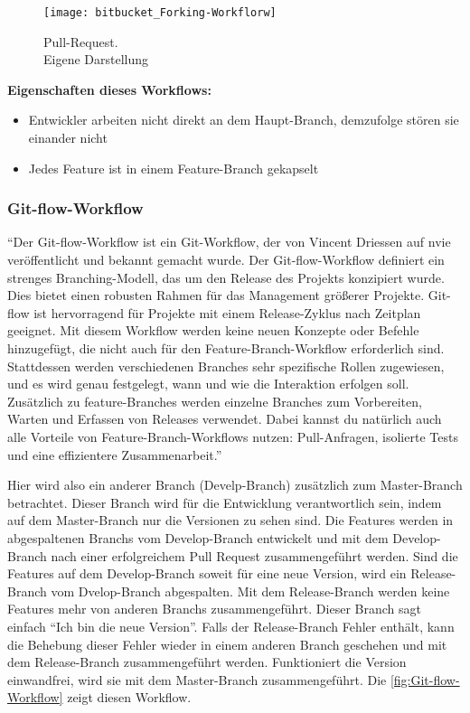 \begin{figure}[htbp]
	\centering
	\texttt{[image: bitbucket\_Forking-Workflorw]}
	\caption[Feature-Branch-Workflow]{Pull-Request.\\Eigene Darstellung}
	\label{fig:Forking-workflow}
\end{figure}

\textbf{Eigenschaften dieses Workflows:}
\begin{itemize}
	\item Entwickler arbeiten nicht direkt an dem Haupt-Branch, demzufolge stören sie einander nicht
	\item Jedes Feature ist in einem Feature-Branch gekapselt
\end{itemize}

\subsubsection{Git-flow-Workflow}
\label{subsubsec:Git-flow-Workflow}

"`Der Git-flow-Workflow ist ein Git-Workflow, der von Vincent Driessen auf nvie veröffentlicht und bekannt gemacht wurde. Der Git-flow-Workflow definiert ein strenges Branching-Modell, das um den Release des Projekts konzipiert wurde. Dies bietet einen robusten Rahmen für das Management größerer Projekte.
Git-flow ist hervorragend für Projekte mit einem Release-Zyklus nach Zeitplan geeignet. Mit diesem Workflow werden keine neuen Konzepte oder Befehle hinzugefügt, die nicht auch für 		den Feature-Branch-Workflow erforderlich sind. Stattdessen werden verschiedenen Branches sehr spezifische Rollen zugewiesen, und es wird genau festgelegt, wann und wie die 				Interaktion erfolgen soll. Zusätzlich zu feature-Branches werden einzelne Branches zum Vorbereiten, Warten und Erfassen von Releases verwendet. Dabei kannst du natürlich auch alle 		Vorteile von Feature-Branch-Workflows nutzen: Pull-Anfragen, isolierte Tests und eine effizientere Zusammenarbeit."' \cite{Git-flow-Workflow}

Hier wird also ein anderer Branch (Develp-Branch) zusätzlich zum Master-Branch betrachtet. Dieser Branch wird für die Entwicklung verantwortlich sein, indem auf dem Master-Branch 			nur die Versionen zu sehen sind. Die Features werden in abgespaltenen Branchs vom Develop-Branch entwickelt und mit dem Develop-Branch nach einer erfolgreichem Pull Request 				zusammengeführt werden. Sind die Features auf dem Develop-Branch soweit für eine neue Version, wird ein Release-Branch vom Dvelop-Branch abgespalten. Mit dem Release-Branch werden keine 			Features mehr von anderen Branchs zusammengeführt. Dieser Branch sagt einfach "`Ich bin die neue Version"'. Falls der Release-Branch Fehler enthält, kann die Behebung dieser			Fehler wieder in einem anderen Branch geschehen und mit dem Release-Branch zusammengeführt werden. Funktioniert die Version einwandfrei, wird sie mit dem Master-Branch 						zusammengeführt. Die \cref{fig:Git-flow-Workflow} zeigt diesen Workflow.


